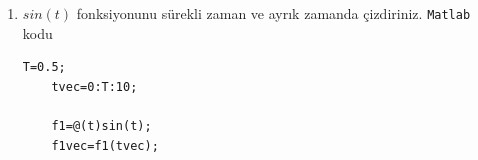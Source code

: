 \begin{enumerate}
\begin{equation}
\begin{split}
                \frac{1}{s}\right\}
                -\frac{1}{2}\mathcal{L}^{-1}\left\{\frac{1}{s+1}\right\}
                +\frac{1}{6}\mathcal{L}^{-1}\left\{\frac{1}{s+3}
            \right\}\\
            y(t)&=\frac{1}{3}\left\{1\right\}-\frac{1}{2}\left\{e^{-t}\right\}+\frac{1}{6}\left\{e^{-3t}
            \right\}\\
            y(t)&=\frac{1}{3}-\frac{1}{2}\left\{e^{-t}\right\}+\frac{1}{6}\left\{e^{-3t}
            \right\}
        \end{split}
    \end{equation}
    elde edilir. 
    
    \item $sin(t)$ fonksiyonunu sürekli zaman ve ayrık zamanda çizdiriniz.
    \verb|Matlab| kodu
    \begin{lstlisting}[style=Matlab-editor]
    T=0.5;
    tvec=0:T:10;

    f1=@(t)sin(t);
    f1vec=f1(tvec);


\end{lstlisting}
\end{enumerate}

